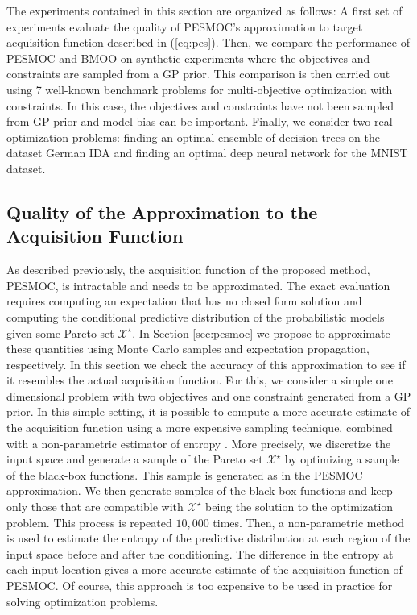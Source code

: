 \documentclass[review,preprint,12pt]{elsarticle}
\begin{document}
The experiments contained in this section are organized as follows: A first set of experiments evaluate 
the quality of PESMOC's approximation to target acquisition function described in (\ref{eq:pes}). 
Then, we compare the performance of PESMOC and BMOO on synthetic experiments where the objectives and 
constraints are sampled from a GP prior. This comparison is then carried out using 7 well-known benchmark 
problems for multi-objective optimization with constraints.  In this case, the objectives and constraints 
have not been sampled from GP prior and model bias can be important. Finally, we consider two real optimization 
problems: finding an optimal ensemble of decision trees on the dataset German IDA and finding an optimal 
deep neural network for the MNIST dataset.

\subsection{Quality of the Approximation to the Acquisition Function}

As described previously, the acquisition function of the proposed method, PESMOC, is intractable and needs to be 
approximated. The exact evaluation requires computing an expectation that has no closed form solution 
and computing the conditional predictive distribution of the probabilistic models given some Pareto set $\mathcal{X}^\star$. 
In Section \ref{sec:pesmoc} we propose to approximate these quantities using Monte Carlo samples and expectation propagation, respectively.
In this section we check the accuracy of this approximation to see if it resembles the actual acquisition function.
For this, we consider a simple one dimensional problem with two objectives and one constraint generated from a 
GP prior. In this simple setting, it is possible to compute a more accurate estimate of the acquisition function
using a more expensive sampling technique, combined with a non-parametric estimator of entropy \citep{singh2003nearest}. 
More precisely, we discretize the input space and generate a sample of the Pareto set $\mathcal{X}^\star$ by optimizing 
a sample of the black-box functions. This sample is generated as in the PESMOC approximation. We then generate
samples of the black-box functions and keep only those that are compatible with $\mathcal{X}^\star$ being the
solution to the optimization problem. This process is repeated $10,000$ times. Then, a non-parametric method is used
to estimate the entropy of the predictive distribution at each region of the input space before and after the conditioning. 
The difference in the entropy at each input location gives a more accurate estimate of the acquisition function of PESMOC.
Of course, this approach is too expensive to be used in practice for solving optimization problems.
\end{document}
